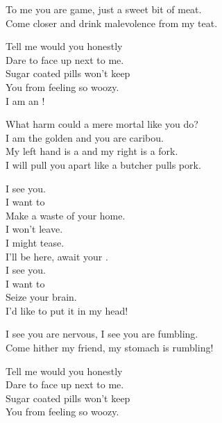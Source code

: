 
To me you are game, just a sweet bit of meat. \\
Come closer and drink malevolence from my teat. \\


Tell me would you honestly \\
Dare to face up next to me. \\
Sugar coated pills won't keep \\
You from feeling so woozy. \\

I am an ! \\


What harm could a mere mortal like you do? \\
I am the golden  and you are caribou. \\

My left hand is a  and my right is a fork. \\
I will pull you apart like a butcher pulls pork. \\


I see you. \\
I want to \\
Make a waste of your home. \\

I won't leave. \\
I might tease. \\
I'll be here, await your . \\

I see you. \\
I want to \\
Seize your brain. \\
I'd like to put it in my head! \\


I see you are nervous, I see you are fumbling. \\
Come hither my friend, my stomach is rumbling! \\


Tell me would you honestly \\
Dare to face up next to me. \\
Sugar coated pills won't keep \\
You from feeling so woozy. \\

